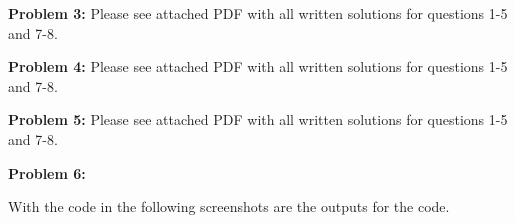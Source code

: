 \documentclass[12pt, letterpaper]{article}
\theoremstyle{nonumberplain}
\begin{document}
\clearpage

\hspace{18pt}\textbf{Problem 3:} \medskip
Please see attached PDF with all written solutions for questions 1-5 and 7-8.

\hspace{18pt}\textbf{Problem 4:} \medskip
Please see attached PDF with all written solutions for questions 1-5 and 7-8.

\hspace{18pt}\textbf{Problem 5:} \medskip
Please see attached PDF with all written solutions for questions 1-5 and 7-8.


\clearpage

\hspace{18pt}\textbf{Problem 6:} \medskip

With the code in the following screenshots are the outputs for the code.
\end{document}
